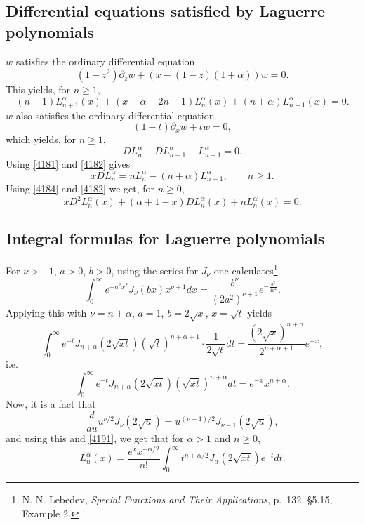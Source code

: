 \documentclass{article}
\theoremstyle{definition}
\begin{document}
\subsection{Differential equations satisfied by Laguerre polynomials}
$w$ satisfies the ordinary differential equation
\[
(1-z^2) \partial_z w + (x-(1-z)(1+\alpha))w=0.
\]
This yields, for $n \geq 1$,
\begin{equation}
(n+1)L_{n+1}^\alpha(x)+(x-\alpha-2n-1)L_n^\alpha(x)+(n+\alpha)L_{n-1}^\alpha(x)=0.
\label{4181}
\end{equation}
$w$ also satisfies the ordinary differential equation
\[
(1-t)\partial_x w + tw=0,
\]
which yields, for $n \geq 1$,
\begin{equation}
DL_n^\alpha-DL_{n-1}^\alpha + L_{n-1}^\alpha=0.
\label{4182}
\end{equation}
Using \eqref{4181} and \eqref{4182} gives
\begin{equation}
xDL_n^\alpha = n L_n^\alpha-(n+\alpha)L_{n-1}^\alpha,
\qquad n \geq 1.
\label{4184}
\end{equation}
Using \eqref{4184} and \eqref{4182} we get, for $n \geq 0$,
\begin{equation}
x D^2 L_n^\alpha(x)+(\alpha+1-x)DL_n^\alpha(x)+nL_n^\alpha(x)=0.
\label{4187}
\end{equation}



\subsection{Integral formulas for Laguerre polynomials}
For $\nu>-1$, $a>0$, $b>0$, using the series for $J_\nu$ one calculates\footnote{N. N. Lebedev,
{\em Special Functions and Their Applications},
p.~132, \S 5.15, Example 2.}
\begin{equation}
\int_0^\infty e^{-a^2x^2} J_\nu(bx)x^{\nu+1} dx=\frac{b^\nu}{(2a^2)^{\nu+1}}e^{-\frac{b^2}{4a^2}}.
\label{5152}
\end{equation}
Applying this with $\nu=n+\alpha$, $a=1$, $b=2\sqrt{x}$, $x=\sqrt{t}$ yields
\[
\int_0^\infty e^{-t} J_{n+\alpha}(2\sqrt{xt}) (\sqrt{t})^{n+\alpha+1} \cdot \frac{1}{2\sqrt{t}} dt
=\frac{(2\sqrt{x})^{n+\alpha}}{2^{n+\alpha+1}} e^{-x},
\]
i.e.
\begin{equation}
\int_0^\infty e^{-t} J_{n+\alpha}(2\sqrt{xt}) (\sqrt{xt})^{n+\alpha} dt = e^{-x} x^{n+\alpha}.
\label{4191}
\end{equation}
Now, it is a fact that
\[
\frac{d}{du} u^{\nu/2} J_\nu(2\sqrt{u}) = u^{(\nu-1)/2} J_{\nu-1}(2\sqrt{u}),
\]
and using this and \eqref{4191}, we get that for $\alpha>1$ and $n \geq 0$,
\begin{equation}
L_n^\alpha(x) = \frac{e^x x^{-\alpha/2}}{n!} \int_0^\infty t^{n+\alpha/2} J_\alpha(2\sqrt{xt}) e^{-t} dt.
\label{4193}
\end{equation}
\end{document}
